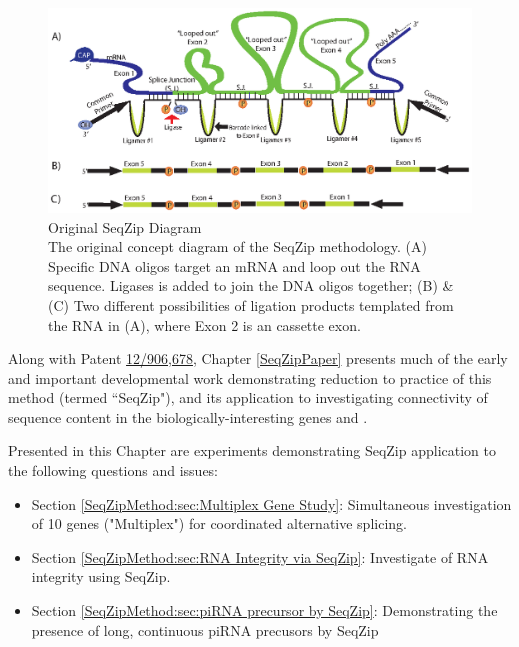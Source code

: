   \begin{figure} %
    \centering 
    \includegraphics{Figures/SeqZipMethod/OriginalSeqZipDiagram.eps}
    \caption[Original SeqZip Diagram]
    {
      Original SeqZip Diagram\\[0.25cm]
      The original concept diagram of the SeqZip methodology. (A) Specific DNA oligos target an mRNA and loop out the RNA sequence. Ligases is added to join the DNA oligos together; (B) \& (C) Two different possibilities of ligation products templated from the RNA in (A), where Exon 2 is an cassette exon.
    	}
    \label{SeqZipMethod:fig:Original SeqZip Diagram}
  	\end{figure}

  Along with Patent \href{http://1.usa.gov/PTG9BB}{12/906,678}, Chapter \ref{SeqZipPaper} presents much of the early and important developmental work demonstrating reduction to practice of this method (termed ``SeqZip"), and its application to investigating connectivity of sequence content in the biologically-interesting genes \fn{} and \dscam{}. 

  Presented in this Chapter are experiments demonstrating SeqZip application to the following questions and issues:

  \begin{itemize} %
    \singlespacing
    \item Section \ref{SeqZipMethod:sec:Multiplex Gene Study}: 
      Simultaneous investigation of 10 genes ("Multiplex") for coordinated alternative splicing.
    \item Section \ref{SeqZipMethod:sec:RNA Integrity via SeqZip}: 
      Investigate of RNA integrity using SeqZip.
    \item Section \ref{SeqZipMethod:sec:piRNA precursor by SeqZip}: 
      Demonstrating the presence of long, continuous piRNA precusors by SeqZip
	  \end{itemize}

